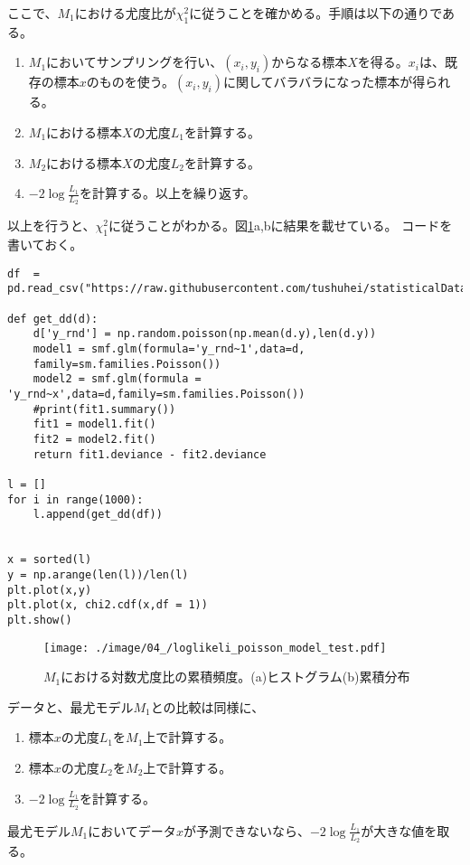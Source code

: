 ここで、$M_1$における尤度比が$\chi_1^2$に従うことを確かめる。手順は以下の通りである。
\begin{enumerate}
    \item $M_1$においてサンプリングを行い、$(x_i,y_i)$からなる標本$X$を得る。$x_i$は、既存の標本$x$のものを使う。$(x_i,y_i)$に関してバラバラになった標本が得られる。
    \item $M_1$における標本$X$の尤度$L_1$を計算する。
    \item $M_2$における標本$X$の尤度$L_2$を計算する。
    \item $-2\log\frac{L_1}{L_2}$を計算する。以上を繰り返す。
\end{enumerate}
以上を行うと、$\chi^2_1$に従うことがわかる。図\ref{fig:loglikelihood_test_simulation_poisson}a,bに結果を載せている。
コードを書いておく。
\begin{lstlisting}
df  = pd.read_csv("https://raw.githubusercontent.com/tushuhei/statisticalDataModeling/master/data3a.csv")

def get_dd(d):
    d['y_rnd'] = np.random.poisson(np.mean(d.y),len(d.y))
    model1 = smf.glm(formula='y_rnd~1',data=d,
    family=sm.families.Poisson())
    model2 = smf.glm(formula = 'y_rnd~x',data=d,family=sm.families.Poisson())
    #print(fit1.summary())
    fit1 = model1.fit()
    fit2 = model2.fit()
    return fit1.deviance - fit2.deviance

l = []
for i in range(1000):
    l.append(get_dd(df))


x = sorted(l)
y = np.arange(len(l))/len(l)
plt.plot(x,y)
plt.plot(x, chi2.cdf(x,df = 1))
plt.show()
\end{lstlisting}


\begin{figure}
    \begin{center}
        \texttt{[image: ./image/04\_/loglikeli\_poisson\_model\_test.pdf]}
        \caption{$M_1$における対数尤度比の累積頻度。(a)ヒストグラム(b)累積分布}
        \label{fig:loglikelihood_test_simulation_poisson}
    \end{center}
\end{figure}


データと、最尤モデル$M_1$との比較は同様に、
\begin{enumerate}
    \item 標本$x$の尤度$L_1$を$M_1$上で計算する。
    \item 標本$x$の尤度$L_2$を$M_2$上で計算する。
    \item $-2\log\frac{L_1}{L_2}$を計算する。
\end{enumerate}
最尤モデル$M_1$においてデータ$x$が予測できないなら、$-2\log\frac{L_1}{L_2}$が大きな値を取る。

